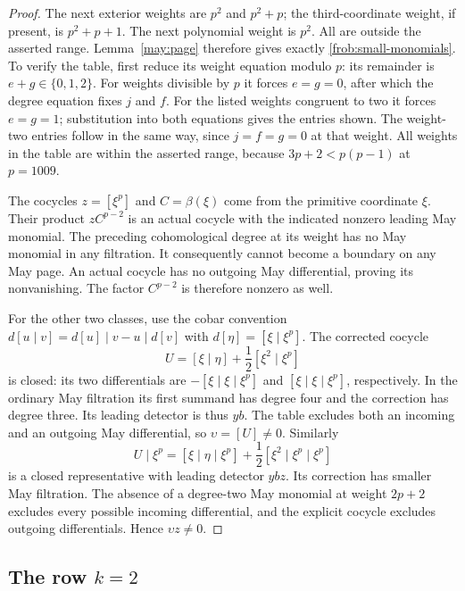 \begin{proof}
The next exterior weights are $p^2$ and $p^2+p$; the third-coordinate
weight, if present, is $p^2+p+1$.  The next polynomial weight is
$p^2$.  All are outside the asserted range.  Lemma~\ref{may:page} therefore
gives exactly \eqref{frob:small-monomials}.  To verify the table,
first reduce its weight equation modulo $p$: its remainder is
$e+g\in\{0,1,2\}$.  For weights divisible by $p$ it forces
$e=g=0$, after which the degree equation fixes $j$ and $f$.
For the listed weights congruent to two it forces $e=g=1$;
substitution into both equations gives the entries shown.
The weight-two entries follow in the same way, since $j=f=g=0$
at that weight.  All weights in the table are within the asserted
range, because $3p+2<p(p-1)$ at $p=1009$.

The cocycles $z=[\xi^p]$ and $C=\beta(\xi)$ come from the
primitive coordinate $\xi$.  Their product $zC^{p-2}$ is an
actual cocycle with the indicated nonzero leading May monomial.
The preceding cohomological degree at its weight has no May
monomial in any filtration.  It consequently cannot become a
boundary on any May page.  An actual cocycle has no outgoing May
differential, proving its nonvanishing.  The factor $C^{p-2}$ is therefore
nonzero as well.

For the other two classes, use the cobar convention
$d[u\mid v]=d[u]\mid v-u\mid d[v]$ with
$d[\eta]=[\xi\mid\xi^p]$.  The corrected cocycle
\begin{equation}\label{frob:corrected-cocycle}
 U=[\xi\mid\eta]+\frac12[\xi^2\mid\xi^p]
\end{equation}
is closed: its two differentials are
$-[\xi\mid\xi\mid\xi^p]$ and
$[\xi\mid\xi\mid\xi^p]$, respectively.  In the ordinary
May filtration its first summand has degree four and the correction
has degree three.  Its leading detector is thus $yb$.  The table
excludes both an incoming and an outgoing May differential, so
$\upsilon=[U]\neq0$.  Similarly
\[
 U\mid\xi^p
   =[\xi\mid\eta\mid\xi^p]
       +\frac12[\xi^2\mid\xi^p\mid\xi^p]
\]
is a closed representative with leading detector $ybz$.
Its correction has smaller May filtration.  The absence of a
degree-two May monomial at weight $2p+2$ excludes every possible
incoming differential, and the explicit cocycle excludes outgoing
differentials.  Hence $\upsilon z\neq0$.
\end{proof}

\subsection{The row \texorpdfstring{$k=2$}{k=2}}

